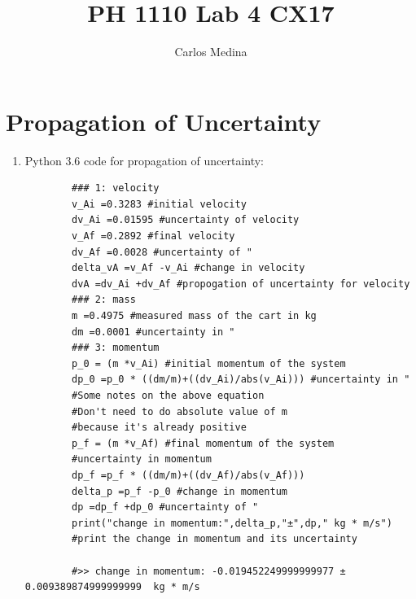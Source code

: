 \documentclass[12pt]{article}
\author{Carlos Medina}
\title{PH 1110 Lab 4 CX17}
\begin{document}
    \setlength{\droptitle}{-60pt}
    \maketitle


    \section{Propagation of Uncertainty}
    \begin{enumerate}
        [1)]
        \item Python 3.6 code for propagation of uncertainty:
        \begin{verbatim}
        ### 1: velocity
        v_Ai =0.3283 #initial velocity
        dv_Ai =0.01595 #uncertainty of velocity
        v_Af =0.2892 #final velocity
        dv_Af =0.0028 #uncertainty of "
        delta_vA =v_Af -v_Ai #change in velocity
        dvA =dv_Ai +dv_Af #propogation of uncertainty for velocity
        ### 2: mass
        m =0.4975 #measured mass of the cart in kg
        dm =0.0001 #uncertainty in "
        ### 3: momentum
        p_0 = (m *v_Ai) #initial momentum of the system
        dp_0 =p_0 * ((dm/m)+((dv_Ai)/abs(v_Ai))) #uncertainty in "
        #Some notes on the above equation
        #Don't need to do absolute value of m
        #because it's already positive
        p_f = (m *v_Af) #final momentum of the system
        #uncertainty in momentum
        dp_f =p_f * ((dm/m)+((dv_Af)/abs(v_Af)))
        delta_p =p_f -p_0 #change in momentum
        dp =dp_f +dp_0 #uncertainty of "
        print("change in momentum:",delta_p,"±",dp," kg * m/s")
        #print the change in momentum and its uncertainty

        #>> change in momentum: -0.019452249999999977 ± 0.009389874999999999  kg * m/s
        \end{verbatim}
    \end{enumerate}
\end{document}
